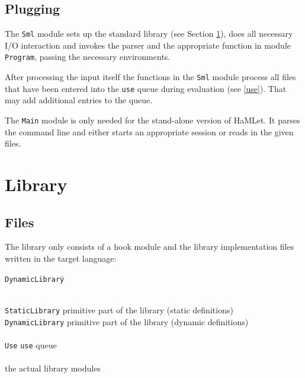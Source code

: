 \documentclass[twoside,titlepage]{article}
\begin{document}
\subsection{Plugging}
\label{plugging}

The {\tt Sml} module sets up the standard library (see Section \ref{lib}), does all necessary I/O interaction and invokes the parser and the appropriate function in module {\tt Program}, passing the necessary environments.

After processing the input itself the functions in the {\tt Sml} module process all files that have been entered into the {\tt use} queue during evaluation (see \ref{use}). That may add additional entries to the queue.

The {\tt Main} module is only needed for the stand-alone version of HaMLet. It parses the command line and either starts an appropriate session or reads in the given files.


\section{Library}
\label{lib}

\subsection{Files}
\label{libfiles}

The library only consists of a hook module and the library implementation files written in the target language:

\begin{quoting}
\begin{tabbing}
{\tt DynamicLibrary}\qquad\= \kill

\hspace{-1em}{\tt lib/} \\
{\tt StaticLibrary}			\> primitive part of the library (static definitions) \\
{\tt DynamicLibrary}			\> primitive part of the library (dynamic definitions) \\
\\
{\tt Use}			\> {\tt use} queue \\
\\
\hspace{-1em}{\tt basis/}			\> the actual library modules\\
\end{tabbing}
\end{quoting}
\end{document}
